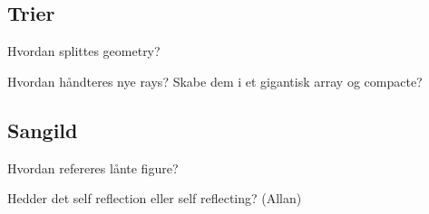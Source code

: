\subsection*{Trier}

Hvordan splittes geometry?

Hvordan håndteres nye rays? Skabe dem i et gigantisk array og
compacte?

\subsection*{Sangild}

Hvordan refereres lånte figure?

Hedder det self reflection eller self reflecting? (Allan)

